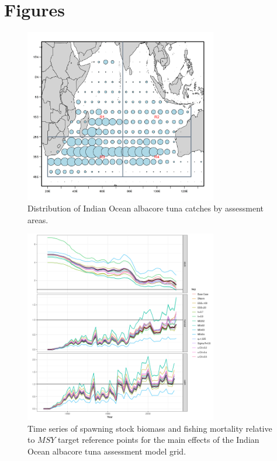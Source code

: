 \newpage
\section*{Figures}

\begin{figure}[ht!]\centering\includegraphics[width=0.75\textwidth]{figures/alb-map.png} 
\caption{Distribution of Indian Ocean albacore tuna catches by assessment areas.}
\label{fig:map}
\end{figure}

\begin{figure}[ht!]\centering\includegraphics[width=0.75\textwidth]{figures/main-trends-1.png} \caption{Time series of spawning stock biomass and fishing mortality relative to $MSY$ target reference points for the main effects of the Indian Ocean albacore tuna assessment model grid.}
\label{fig:ts}
\end{figure}

